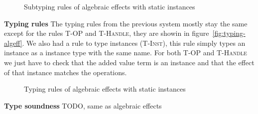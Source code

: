 {\begin{figure}
\caption{Subtyping rules of algebraic effects with static instances}
\centering
{}
\end{figure}

\textbf{Typing rules}
The typing rules from the previous system mostly stay the same except for the rules \textsc{T-OP} and \textsc{T-Handle}, they are showin in figure~\ref{fig:typing-algeff}.
We also had a rule to type instances (\textsc{T-Inst}), this rule simply types an instance as a instance type with the same name.
For both \textsc{T-OP} and \textsc{T-Handle} we just have to check that the added value term is an instance and that the effect of that instance matches the operations.

\begin{figure}
\caption{Typing rules of algebraic effects with static instances}
\centering
{}
\end{figure}

\textbf{Type soundness}
TODO, same as algebraic effects

}